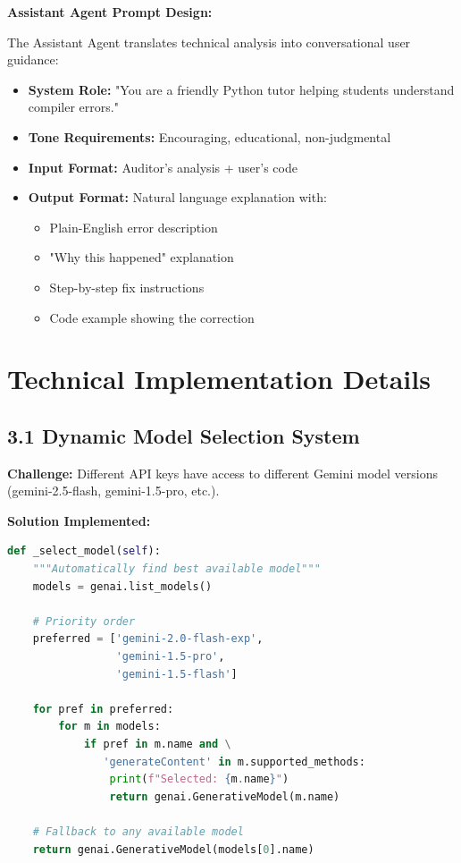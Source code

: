 \documentclass[a4paper,11pt]{article}
\begin{document}
\textbf{Assistant Agent Prompt Design:}

The Assistant Agent translates technical analysis into conversational user guidance:

\begin{itemize}[leftmargin=*]
    \item \textbf{System Role:} "You are a friendly Python tutor helping students understand compiler errors."
    \item \textbf{Tone Requirements:} Encouraging, educational, non-judgmental
    \item \textbf{Input Format:} Auditor's analysis + user's code
    \item \textbf{Output Format:} Natural language explanation with:
    \begin{itemize}
        \item Plain-English error description
        \item "Why this happened" explanation
        \item Step-by-step fix instructions
        \item Code example showing the correction
    \end{itemize}
\end{itemize}

\newpage

\section{Technical Implementation Details}

\subsection{3.1 Dynamic Model Selection System}

\textbf{Challenge:} Different API keys have access to different Gemini model versions (gemini-2.5-flash, gemini-1.5-pro, etc.).

\textbf{Solution Implemented:}
\begin{lstlisting}[language=Python, caption=Robust Model Selection]
def _select_model(self):
    """Automatically find best available model"""
    models = genai.list_models()
    
    # Priority order
    preferred = ['gemini-2.0-flash-exp', 
                 'gemini-1.5-pro', 
                 'gemini-1.5-flash']
    
    for pref in preferred:
        for m in models:
            if pref in m.name and \
               'generateContent' in m.supported_methods:
                print(f"Selected: {m.name}")
                return genai.GenerativeModel(m.name)
    
    # Fallback to any available model
    return genai.GenerativeModel(models[0].name)
\end{lstlisting}
\end{document}
